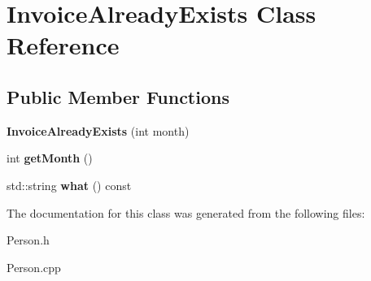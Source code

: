\hypertarget{class_invoice_already_exists}{}\section{Invoice\+Already\+Exists Class Reference}
\label{class_invoice_already_exists}
\subsection*{Public Member Functions}
\begin{DoxyCompactItemize}
\item 
\mbox{\label{class_invoice_already_exists_ae5d642f496997633c4a4dbc3c8347374}} 
{\bfseries Invoice\+Already\+Exists} (int month)
\item 
\mbox{\label{class_invoice_already_exists_a75da257c1dfbaa7cacf89e79c759eb43}} 
int {\bfseries get\+Month} ()
\item 
\mbox{\label{class_invoice_already_exists_ae0239e7ba5445491a3182d77d34b1505}} 
std\+::string {\bfseries what} () const
\end{DoxyCompactItemize}


The documentation for this class was generated from the following files\+:\begin{DoxyCompactItemize}
\item 
Person.\+h\item 
Person.\+cpp\end{DoxyCompactItemize}
